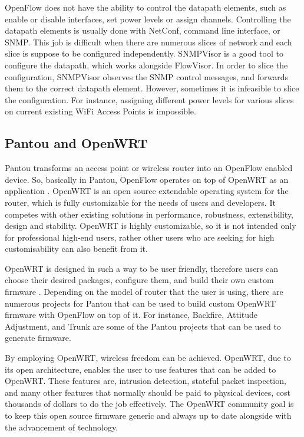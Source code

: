 OpenFlow does not have the ability to control the datapath elements, such as enable or disable interfaces, set power levels or assign channels. Controlling the datapath elements is usually done with NetConf, command line interface, or SNMP. This job is difficult when there are numerous slices of network and each slice is suppose to be configured independently. SNMPVisor is a good tool to configure the datapath, which works alongside FlowVisor. In order to slice the configuration, SNMPVisor observes the SNMP control messages, and forwards them to the correct datapath element. However, sometimes it is infeasible to slice the configuration. For instance, assigning different power levels for various slices on current existing WiFi Access Points is impossible. 

\subsection{Pantou and OpenWRT}

Pantou transforms an access point or wireless router into an OpenFlow enabled device. So, basically in Pantou, OpenFlow operates on top of OpenWRT as an application \cite{Yia04}. OpenWRT is an open source extendable operating system for the router, which is fully customizable for the needs of users and developers. It competes with other existing solutions in performance, robustness, extensibility, design and stability. OpenWRT is highly customizable, so it is not intended only for professional high-end users, rather other users who are seeking for high customisability can also benefit from it. \cite{Lor14}

OpenWRT is designed in such a way to be user friendly, therefore users can choose their desired packages, configure them, and build their own custom firmware \cite{Lor14}. Depending on the model of router that the user is using, there are numerous projects for Pantou that can be used to build custom OpenWRT firmware with OpenFlow on top of it. For instance, Backfire, Attitude Adjustment, and Trunk are some of the Pantou projects that can be used to generate firmware. \cite{Sve14}

By employing OpenWRT, wireless freedom can be achieved. OpenWRT, due to its open architecture, enables the user to use features that can be added to OpenWRT. These features are, intrusion detection, stateful packet inspection, and many other features that normally should be paid to physical devices, cost thousands of dollars to do the job effectively. The OpenWRT community goal is to keep this open source firmware generic and always up to date alongside with the advancement of technology. 

